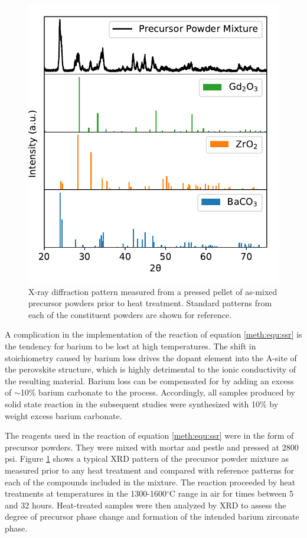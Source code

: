 \begin{figure}
    \centering
    \includegraphics{Figures/170606-xrd-ssr-reaction-monitoring-before-rxn-separate-plots.pdf}
    \caption{X-ray diffraction pattern measured from a pressed pellet of as-mixed precursor powders prior to heat treatment. Standard patterns from each of the constituent powders are shown for reference.}
    \label{fig:target:xrd:reaction:before:separated}
\end{figure}

A complication in the implementation of the reaction of equation \ref{meth:equ:ssr} is the tendency for barium to be lost at high temperatures. The shift in stoichiometry caused by barium loss drives the dopant element into the A-site of the perovskite structure, which is highly detrimental to the ionic conductivity of the resulting material. Barium loss can be compensated for by adding an excess of $\sim$10\% barium carbonate to the process. Accordingly, all samples produced by solid state reaction in the subsequent studies were synthesized with 10\% by weight excess barium carbonate. 



The reagents used in the reaction of equation \ref{meth:equ:ssr} were in the form of precursor powders. They were mixed with mortar and pestle and pressed at 2800 psi. Figure \ref{fig:target:xrd:reaction:before:separated} shows a typical XRD pattern of the precursor powder mixture as measured prior to any heat treatment and compared with reference patterns for each of the compounds included in the mixture. The reaction proceeded by heat treatments at temperatures in the 1300-1600$^\circ$C range in air for times between 5 and 32 hours. Heat-treated samples were then analyzed by XRD to assess the degree of precursor phase change and formation of the intended barium zirconate phase.

